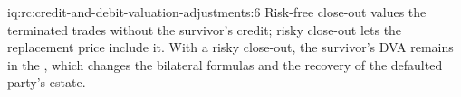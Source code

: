 \begin{solution}{iq:rc:credit-and-debit-valuation-adjustments:6}
Risk-free close-out values the terminated trades without the survivor's credit; risky
close-out lets the replacement price include it. With a risky close-out, the survivor's DVA
remains in the , which changes the bilateral formulas and the recovery of the
defaulted party's estate.
\end{solution}
